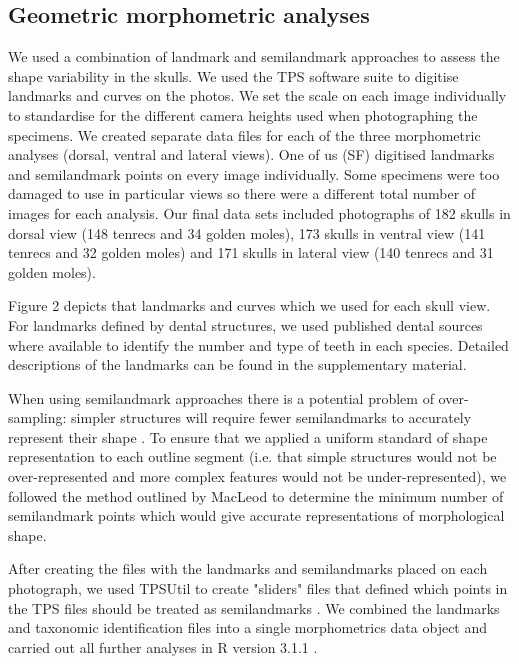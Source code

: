 \documentclass[12pt,a4paper]{article}
\begin{document}
\subsection{Geometric morphometric analyses}

	We used a combination of landmark and semilandmark approaches to assess the shape variability in the skulls.  We used the TPS software suite \citep{Rohlf2013} to digitise landmarks and curves on the photos. We set the scale on each image individually to standardise for the different camera heights used when photographing the specimens. We created separate data files for each of the three morphometric analyses (dorsal, ventral and lateral views). One of us (SF) digitised landmarks and semilandmark points on every image individually. Some specimens were too damaged to use in particular views so there were a different total number of images for each analysis. Our final data sets included photographs of 182 skulls in dorsal view (148 tenrecs and 34 golden moles), 173 skulls in ventral view (141 tenrecs and 32 golden moles) and 171 skulls in lateral view (140 tenrecs and 31 golden moles).

	Figure 2 depicts that landmarks and curves which we used for each skull view. For landmarks defined by dental structures, we used published dental sources \citep{Repenning1967, Eisenberg1969, Nowak1983, MacPhee1987, KnoxJones1992, Davis1997, Querouil2001, Nagorsen2002, Wilson2005, Goodman2006, Karatas2007, Hoffmann2008, Asher2008,  Muldoon2009, Lin2010} where available to identify the number and type of teeth in each species. Detailed descriptions of the landmarks can be found in the supplementary material.

	When using semilandmark approaches there is a potential problem of over-sampling: simpler structures will require fewer semilandmarks to accurately represent their shape \citep{MacLeod2012}. To ensure that we applied a uniform standard of shape representation to each outline segment (i.e. that simple structures would not be over-represented and more complex features would not be under-represented), we followed the method outlined by MacLeod \citeyearpar{MacLeod2012} to determine the minimum number of semilandmark points which would give accurate representations of morphological shape.
	
	After creating the files with the landmarks and semilandmarks placed on each photograph, we used TPSUtil \citep{Rohlf2012} to create "sliders" files that defined which points in the TPS files should be treated as semilandmarks \citep{Zelditch2012}. We combined the landmarks and taxonomic identification files into a single morphometrics data object and carried out all further analyses in R version 3.1.1 \citep{Team2014}. 
	
\end{document}

